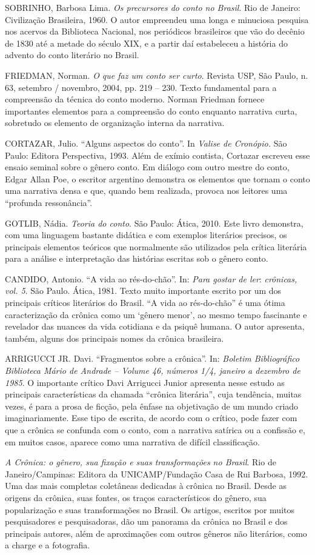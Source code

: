 SOBRINHO, Barbosa Lima. \emph{Os precursores do conto no Brasil}. Rio de
Janeiro: Civilização Brasileira, 1960. O autor empreendeu uma longa e
minuciosa pesquisa nos acervos da Biblioteca Nacional, nos periódicos
brasileiros que vão do decênio de 1830 até a metade do século XIX, e a
partir daí estabeleceu a história do advento do conto literário no
Brasil.

FRIEDMAN, Norman. \emph{O que faz um conto ser curto}. Revista USP, São
Paulo, n. 63, setembro / novembro, 2004, pp. 219 -- 230. Texto
fundamental para a compreensão da técnica do conto moderno. Norman
Friedman fornece importantes elementos para a compreensão do conto
enquanto narrativa curta, sobretudo os elemento de organização interna
da narrativa.

CORTAZAR, Julio. ``Alguns aspectos do conto''. In \emph{Valise de
Cronópio.} São Paulo: Editora Perspectiva, 1993. Além de exímio
contista, Cortazar escreveu esse ensaio seminal sobre o gênero conto. Em
diálogo com outro mestre do conto, Edgar Allan Poe, o escritor argentino
demonstra os elementos que tornam o conto uma narrativa densa e que,
quando bem realizada, provoca nos leitores uma ``profunda ressonância''.

GOTLIB, Nádia. \emph{Teoria do conto}. São Paulo: Ática, 2010. Este
livro demonstra, com uma linguagem bastante didática e com exemplos
literários precisos, os principais elementos teóricos que normalmente
são utilizados pela crítica literária para a análise e interpretação das
histórias escritas sob o gênero conto.

CANDIDO, Antonio. ``A vida ao rés-do-chão''. In: \emph{Para gostar de
ler}: \emph{crônicas, vol. 5}. São Paulo. Ática, 1981. Texto muito
importante escrito por um dos principais críticos literários do Brasil.
``A vida ao rés-do-chão'' é uma ótima caracterização da crônica como um
`gênero menor', ao mesmo tempo fascinante e revelador das nuances da
vida cotidiana e da psiquê humana. O autor apresenta, também, alguns dos
principais nomes da crônica brasileira.

ARRIGUCCI JR. Davi. ``Fragmentos sobre a crônica''. In: \emph{Boletim
Bibliográfico Biblioteca Mário de Andrade -- Volume 46, números 1/4,
janeiro a dezembro de 1985}. O importante crítico Davi Arrigucci Junior
apresenta nesse estudo as principais características da chamada
``crônica literária'', cuja tendência, muitas vezes, é para a prosa de
ficção, pela ênfase na objetivação de um mundo criado imaginariamente.
Esse tipo de escrita, de acordo com o crítico, pode fazer com que a
crônica se confunda com o conto, com a narrativa satírica ou a confissão
e, em muitos casos, aparece como uma narrativa de difícil classificação.

\emph{A Crônica: o gênero, sua fixação e suas transformações no Brasil}.
Rio de Janeiro/Campinas: Editora da UNICAMP/Fundação Casa de Rui
Barbosa, 1992. Uma das mais completas coletâneas dedicadas à crônica no
Brasil. Desde as origens da crônica, suas fontes, os traços
característicos do gênero, sua popularização e suas transformações no
Brasil. Os artigos, escritos por muitos pesquisadores e pesquisadoras,
dão um panorama da crônica no Brasil e dos principais autores, além de
aproximações com outros gêneros não literários, como a charge e a
fotografia.
